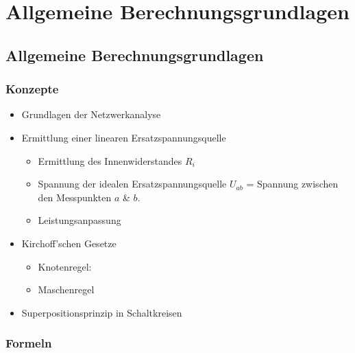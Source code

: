 \part{Allgemeine Berechnungsgrundlagen}

\chapter*{Allgemeine Berechnungsgrundlagen}

\section*{Konzepte}

\begin{itemize}
  \item Grundlagen der Netzwerkanalyse
  \item Ermittlung einer linearen Ersatzspannungsquelle
  \begin{itemize}
    \item Ermittlung des Innenwiderstandes \(R_i\)
    \item Spannung der idealen Ersatzspannungsquelle \(U_{ab}\) = Spannung zwischen den Messpunkten \(a\) \& \(b\).
    \item Leistungsanpassung
  \end{itemize}
  \item Kirchoff’schen Gesetze
  \begin{itemize}
    \item Knotenregel:
    \item Maschenregel
  \end{itemize}
  \item Superpositionsprinzip in Schaltkreisen
\end{itemize}

\section*{Formeln}

